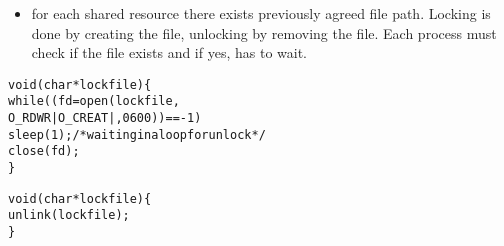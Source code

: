 \begin{slide}
\begin{itemize}
\item for each shared resource there exists previously agreed file path.
Locking is done by creating the file, unlocking by removing the file.
Each process must check if the file exists and if yes, has to wait.
\end{itemize}
\begin{alltt}
void (char *lockfile) \{
    while( (fd = open(lockfile,
                      O\_RDWR|O\_CREAT|, 0600)) == -1)
        sleep(1); {\rm /* waiting in a loop for unlock */}
    close(fd);
\}

void (char *lockfile) \{
    unlink(lockfile);
\}
\end{alltt}
\end{slide}

